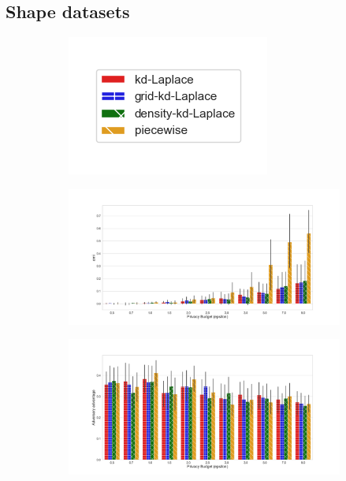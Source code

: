 \subsection{Shape datasets}

\begin{figure}[H]
    \centering
    \begin{subfigure}{0.30\textwidth}
        \includegraphics[width=\textwidth]{Results/kd-laplace/ami_bar_comparison_legend.png}
    \end{subfigure}
    \begin{subfigure}{1\textwidth}
        \includegraphics[width=1\textwidth]{Results/kd-laplace/ami_circle-dataset_comparison.png}
    \end{subfigure}
    \begin{subfigure}{1\textwidth}
        \includegraphics[width=1\textwidth]{Results/kd-laplace/shokri_mi_adv_circle-dataset_comparison.png}

\end{subfigure}
\end{figure}
